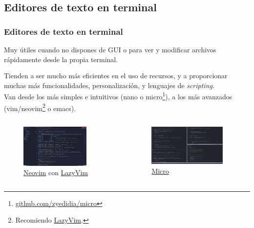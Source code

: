 \documentclass[aspectratio=43]{beamer}
\begin{document}
\subsection{Editores de texto en terminal}

\begin{frame}
    \frametitle{Editores de texto en terminal}
    Muy útiles cuando no dispones de GUI o para ver y modificar archivos rápidamente desde la propia terminal.\newline

    Tienden a ser mucho más eficientes en el uso de recursos, y a proporcionar muchas más funcionalidades, personalización, y lenguajes de \textit{scripting}.\\
    Van desde los más simples e intuitivos (nano o micro\footnote{\href{https://github.com/zyedidia/micro}{github.com/zyedidia/micro}}), a los más avanzados (vim/neovim\footnote{Recomiendo \href{https://www.lazyvim.org/}{LazyVim}.} o emacs).

    \begin{columns}[c]
        \begin{column}{0.4\textwidth}
            \begin{figure}
                \centering
                \includegraphics[width=0.8\textwidth]{img/lazyvim.png}
                \caption{\href{https://neovim.io/}{Neovim} con \href{https://www.lazyvim.org/}{LazyVim}}
            \end{figure}
        \end{column}
        \begin{column}{0.4\textwidth}
            \begin{figure}
                \centering
                \includegraphics[width=0.9\textwidth]{img/micro.png}
                \caption{\href{https://github.com/zyedidia/micro}{Micro}}
            \end{figure}
        \end{column}
    \end{columns}


\end{frame}
\end{document}

